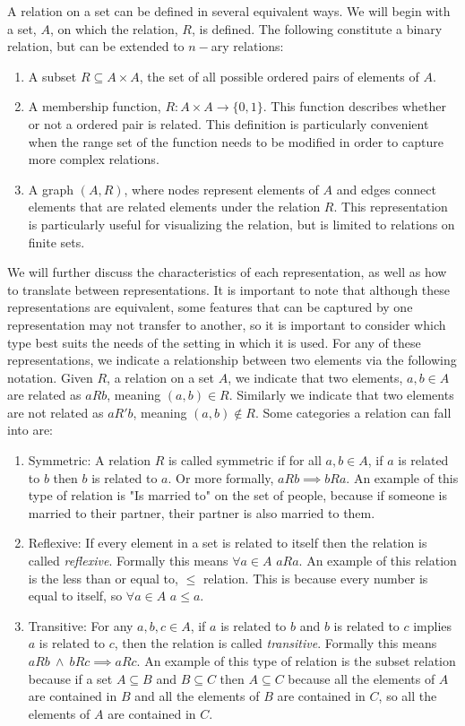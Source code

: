 \documentclass{article}
\begin{document}
A relation on a set can be defined in several equivalent ways. We will begin with a set, $A$, on which the relation, $R$, is defined. The following constitute a binary relation, but can be extended to $n-$ary relations:
\begin{enumerate}
    \item A subset $ R\subseteq A\times A$, the set of all possible ordered pairs of elements of $A$.
    \item A membership function, $R:A\times A \to \{0,1\}$. This function describes whether or not a ordered pair is related. This definition is  particularly convenient when the range set of the function needs to be modified in order to capture more complex relations.
    \item A graph $(A,R)$, where nodes represent elements of $A$ and edges connect elements that are related elements under the relation $R$. This representation is particularly useful for visualizing the relation, but is limited to relations on finite sets.
\end{enumerate}
We will further discuss the characteristics of each representation, as well as how to translate between representations. It is important to note that although these representations are equivalent, some features that can be captured by one representation may not transfer to another, so it is important to consider which type best suits the needs of the setting in which it is used. For any of these representations, we indicate a relationship between two elements via the following notation. Given $R$, a relation on a set $A$, we indicate that two elements, $a,b\in A$ are related as $aRb$, meaning $(a,b)\in R$. Similarly we indicate that two elements are not related as $aR'b$, meaning $(a,b)\notin R$. Some categories a relation can fall into are:
\begin{enumerate}
    \item Symmetric: A relation $R$ is called symmetric if for all $a,b\in A$, if $a$ is related to $b$ then $b$ is related to $a$. Or more formally, $aRb \implies bRa$. An example of this type of relation is "Is married to" on the set of people, because if someone is married to their partner, their partner is also married to them.
    \item Reflexive: If every element in a set is related to itself then the relation is called \emph{reflexive}. Formally this means $\forall a\in A$ $aRa$. An example of this relation is the less than or equal to, $\leq$ relation. This is because every number is equal to itself, so $\forall a\in A$ $a\leq a$. 
    \item Transitive: For any $a,b,c\in A$, if $a$ is related to $b$ and $b$ is related to $c$ implies $a$ is related to $c$, then the relation is called \emph{transitive}. Formally this means $aRb\ \wedge\ bRc\implies aRc$. An example of this type of relation is the subset relation because if a set $A\subseteq B$ and $B\subseteq C$ then $A\subseteq C$ because all the elements of $A$ are contained in $B$ and all the elements of $B$ are contained in $C$, so all the elements of $A$ are contained in $C$.
\end{enumerate}
\end{document}
